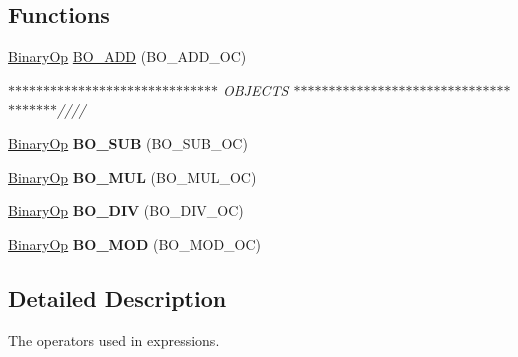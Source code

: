 \subsection*{Functions}
\begin{DoxyCompactItemize}
\item 
\mbox{\label{namespacespan_1_1ir_1_1op_a3dfffc77e0d134c799ab98945ac9f680}} 
\hyperlink{classspan_1_1ir_1_1op_1_1BinaryOp}{Binary\+Op} \hyperlink{namespacespan_1_1ir_1_1op_a3dfffc77e0d134c799ab98945ac9f680}{B\+O\+\_\+\+A\+DD} (B\+O\+\_\+\+A\+D\+D\+\_\+\+OC)
\begin{DoxyCompactList}\small\item\em $\ast$$\ast$$\ast$$\ast$$\ast$$\ast$$\ast$$\ast$$\ast$$\ast$$\ast$$\ast$$\ast$$\ast$$\ast$$\ast$$\ast$$\ast$$\ast$$\ast$$\ast$$\ast$$\ast$$\ast$$\ast$$\ast$$\ast$$\ast$$\ast$$\ast$ O\+B\+J\+E\+C\+TS $\ast$$\ast$$\ast$$\ast$$\ast$$\ast$$\ast$$\ast$$\ast$$\ast$$\ast$$\ast$$\ast$$\ast$$\ast$$\ast$$\ast$$\ast$$\ast$$\ast$$\ast$$\ast$$\ast$$\ast$$\ast$$\ast$$\ast$$\ast$$\ast$$\ast$$\ast$$\ast$$\ast$$\ast$$\ast$$\ast$$\ast$$\ast$//// \end{DoxyCompactList}\item 
\mbox{\label{namespacespan_1_1ir_1_1op_a8306adbe3a2edb72c28a5fa90518c902}} 
\hyperlink{classspan_1_1ir_1_1op_1_1BinaryOp}{Binary\+Op} {\bfseries B\+O\+\_\+\+S\+UB} (B\+O\+\_\+\+S\+U\+B\+\_\+\+OC)
\item 
\mbox{\label{namespacespan_1_1ir_1_1op_ade700d0d5e08d964fe517e24152a040a}} 
\hyperlink{classspan_1_1ir_1_1op_1_1BinaryOp}{Binary\+Op} {\bfseries B\+O\+\_\+\+M\+UL} (B\+O\+\_\+\+M\+U\+L\+\_\+\+OC)
\item 
\mbox{\label{namespacespan_1_1ir_1_1op_a2f1330f5059365f7d6329bc5146ef2cf}} 
\hyperlink{classspan_1_1ir_1_1op_1_1BinaryOp}{Binary\+Op} {\bfseries B\+O\+\_\+\+D\+IV} (B\+O\+\_\+\+D\+I\+V\+\_\+\+OC)
\item 
\mbox{\label{namespacespan_1_1ir_1_1op_ae9f8aa3865a2c3ae31272190cd0c3e46}} 
\hyperlink{classspan_1_1ir_1_1op_1_1BinaryOp}{Binary\+Op} {\bfseries B\+O\+\_\+\+M\+OD} (B\+O\+\_\+\+M\+O\+D\+\_\+\+OC)
\end{DoxyCompactItemize}


\subsection{Detailed Description}
The operators used in expressions. 